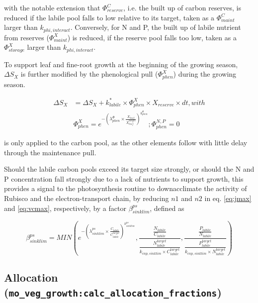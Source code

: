 with the notable extension that $\Phi^{C}_{reserve}$, i.e. the built up of carbon reserves, is reduced if the labile pool falls to low relative to its target, taken as a $\Phi^{C}_{maint}$ larger than $k_{phi,interact}$. Conversely, for N and P, the built up of labile nutrient from reserves ($\Phi^{X}_{maint}$) is reduced, if the reserve pool falls too low, taken as a $\Phi^{X}_{storage}$ larger than $k_{phi,interact}$. 

To support leaf and fine-root growth at the beginning of the growing season, $\Delta S_X$ is further modified by the phenological pull ($\Phi^{X}_{phen}$) during the growing season.

\begin{subequations}
\begin{align}
\Delta S_X  &= \Delta S_X + k^{*}_{labile} \times \Phi^{X}_{phen} \times X_{reserve} \times dt, with \\
&\Phi^{X}_{phen} = e^{-(\lambda^{\Phi}_{phen} \times \frac{X_{leaf}}{X^{target}_{leaf}})^{k^{\Phi}_{phen}}}; \Phi^{N,P}_{phen} = 0 \label{eq:veg:phiphen}
\end{align}
\end{subequations}

is only applied to the carbon pool, as the other elements follow with little delay through the maintenance pull. 

Should the labile carbon pools exceed its target size strongly, or should the N and P concentration fall strongly due to a lack of nutrients to support growth, this provides a signal to the photosynthesis routine to downacclimate the activity of Rubisco and the electron-transport chain, by reducing $n1$ and $n2$ in eq. \ref{eq:jmax} and \ref{eq:vcmax}, respectively, by a factor $\beta_{sinklim}^{ps}$, defined as 

\begin{equation}\label{eq:beta_sinklim_ps}
\beta_{sinklim}^{ps} = MIN(e^{-(\lambda_{sinklim}^{ps} \times \frac{C_{labile}}{C^{target}_{labile}})^{k_{sinklim}^{ps}}}, 
                           \frac{\frac{N_{labile}}{C_{labile}}}{\frac{N^{target}_{labile}}{k_{cnp,sinklim} \times C^{target}_{labile}}}, 
                           \frac{\frac{P_{labile}}{N_{labile}}}{\frac{P^{target}_{labile}}{k_{cnp,sinklim} \times N^{target}_{labile}}}) 
\end{equation}

\subsection{Allocation (\texttt{mo\_veg\_growth:calc\_allocation\_fractions})}\label{sec:Allocation}


